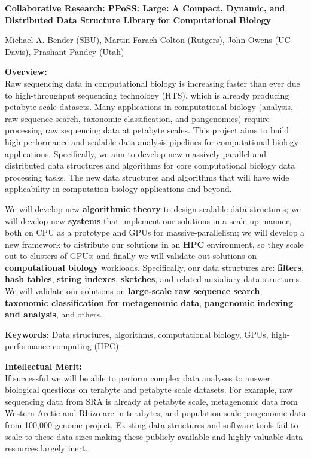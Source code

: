 
\begin{center}
\bf
\Large
Collaborative Research: PPoSS\@: Large: A Compact, Dynamic, and Distributed Data
Structure Library for Computational Biology

\medskip
\small
Michael A. Bender (SBU), Martin Farach-Colton (Rutgers), John Owens (UC Davis),
Prashant Pandey (Utah)
\end{center}


\noindent \textbf{\large Overview:}\\
Raw sequencing data in computational biology is increasing faster than ever due to high-throughput sequencing technology (HTS), which is already producing petabyte-scale datasets. Many applications in computational biology (\kmer analysis, raw sequence search, taxonomic classification, and pangenomics) require processing raw sequencing data at petabyte scales. This project aims to build high-performance and scalable data analysis-pipelines for computational-biology applications. Specifically, we aim to develop new massively-parallel and distributed data structures and algorithms for core computational biology data processing tasks. The new data structures and algorithms that will have wide applicability in computation biology applications and beyond.

We will develop new \textbf{algorithmic theory} to design scalable data structures; we will develop new \textbf{systems} that implement our solutions in a scale-up manner,  both on CPU as a prototype and GPUs for massive-parallelism; we will develop a new framework to distribute our solutions in an \textbf{HPC} environment, so they  scale out to clusters of GPUs; and finally we will validate out solutions on \textbf{computational biology} workloads.
%
Specifically, our data structures are: \textbf{filters}, \textbf{hash tables}, \textbf{string indexes}, \textbf{sketches}, and related auxialiary data structures.  We will validate our solutions on \textbf{large-scale raw sequence search}, \textbf{taxonomic classification for metagenomic data}, \textbf{pangenomic indexing and analysis}, and others.


\noindent \textbf{\large Keywords:} Data structures, algorithms, computational biology, GPUs, high-performance computing (HPC).

\noindent \textbf{\large Intellectual Merit:}\\
If successful we will be able to perform complex data analyses to answer biological questions on terabyte and petabyte scale datasets. For example, raw sequencing data from SRA is already at petabyte scale, metagenomic data from Western Arctic and Rhizo are in terabytes, and population-scale pangenomic data from 100,000 genome project. Existing data structures and software tools fail to scale to these data sizes making these publicly-available and highly-valuable data resources largely inert.

